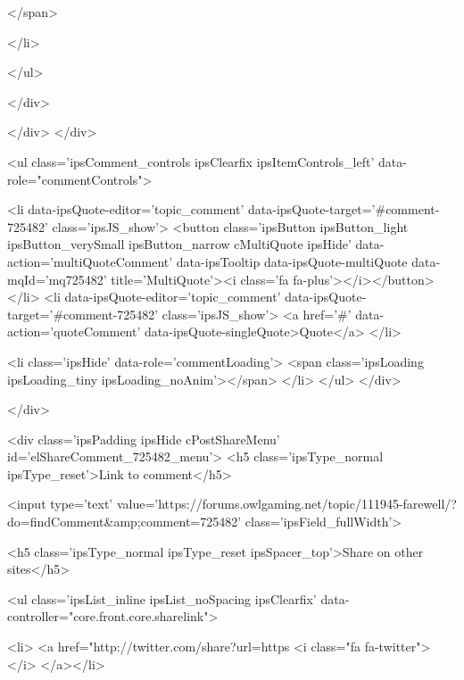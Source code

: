 						</span>
					
				</li>
			
		
	</ul>

					
				</div>
			
			
			
		</div>
	</div>

					
				
				<ul class='ipsComment_controls ipsClearfix ipsItemControls_left' data-role="commentControls">
					
						
							<li data-ipsQuote-editor='topic_comment' data-ipsQuote-target='#comment-725482' class='ipsJS_show'>
								<button class='ipsButton ipsButton_light ipsButton_verySmall ipsButton_narrow cMultiQuote ipsHide' data-action='multiQuoteComment' data-ipsTooltip data-ipsQuote-multiQuote data-mqId='mq725482' title='MultiQuote'><i class='fa fa-plus'></i></button>
							</li>
							<li data-ipsQuote-editor='topic_comment' data-ipsQuote-target='#comment-725482' class='ipsJS_show'>
								<a href='#' data-action='quoteComment' data-ipsQuote-singleQuote>Quote</a>
							</li>
						
						
						
					
					<li class='ipsHide' data-role='commentLoading'>
						<span class='ipsLoading ipsLoading_tiny ipsLoading_noAnim'></span>
					</li>
				</ul>
			</div>
		

		
			

		
	</div>

	

	



<div class='ipsPadding ipsHide cPostShareMenu' id='elShareComment_725482_menu'>
	<h5 class='ipsType_normal ipsType_reset'>Link to comment</h5>
	
		
	
	
	<input type='text' value='https://forums.owlgaming.net/topic/111945-farewell/?do=findComment&amp;comment=725482' class='ipsField_fullWidth'>

	
	<h5 class='ipsType_normal ipsType_reset ipsSpacer_top'>Share on other sites</h5>
	

	<ul class='ipsList_inline ipsList_noSpacing ipsClearfix' data-controller="core.front.core.sharelink">
		
			<li>
<a href="http://twitter.com/share?url=https%
	<i class="fa fa-twitter"></i>
</a></li>
		
